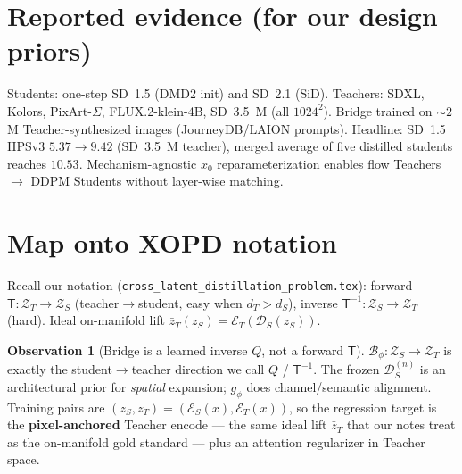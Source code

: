\documentclass[11pt,a4paper]{article}
\newcommand{\Za}{\mathcal{Z}_{T}}
\newcommand{\Zb}{\mathcal{Z}_{S}}
\newcommand{\Enc}{\mathcal{E}}
\newcommand{\Dec}{\mathcal{D}}
\newcommand{\Bridge}{\mathcal{B}}
\newcommand{\Tmap}{\mathsf{T}}
\newcommand{\Tinv}{\mathsf{T}^{-1}}
\theoremstyle{definition}
\newtheorem{observation}{Observation}
\begin{document}
\section{Reported evidence (for our design priors)}
\label{sec:evidence}

Students: one-step SD~1.5 (DMD2 init) and SD~2.1 (SiD). Teachers: SDXL, Kolors,
PixArt-$\Sigma$, FLUX.2-klein-4B, SD~3.5~M (all $1024^2$). Bridge trained on ${\sim}2$M
Teacher-synthesized images (JourneyDB/LAION prompts). Headline: SD~1.5 HPSv3
$5.37\to 9.42$ (SD~3.5~M teacher), merged average of five distilled students reaches
$10.53$. Mechanism-agnostic $x_0$ reparameterization enables flow Teachers $\to$ DDPM
Students without layer-wise matching.

\section{Map onto XOPD notation}
\label{sec:map}

Recall our notation (\texttt{cross\_latent\_distillation\_problem.tex}):
forward $\Tmap:\Za\to\Zb$ (teacher$\to$student, easy when $d_T>d_S$),
inverse $\Tinv:\Zb\to\Za$ (hard). Ideal on-manifold lift
$\bar z_T(z_S)=\Enc_T(\Dec_S(z_S))$.

\begin{observation}[Bridge is a learned inverse $Q$, not a forward $\Tmap$]
\label{obs:bridge-is-Q}
$\Bridge_\phi:\Zb\to\Za$ is exactly the student$\to$teacher direction we call $Q$ /
$\Tinv$. The frozen $\Dec_S^{(n)}$ is an architectural prior for \emph{spatial}
expansion; $g_\phi$ does channel/semantic alignment. Training pairs are
$(z_S,z_T)=(\Enc_S(x),\Enc_T(x))$, so the regression target is the
\textbf{pixel-anchored} Teacher encode --- the same ideal lift
$\bar z_T$ that our notes treat as the on-manifold gold standard --- plus an
attention regularizer in Teacher space.
\end{observation}
\end{document}

